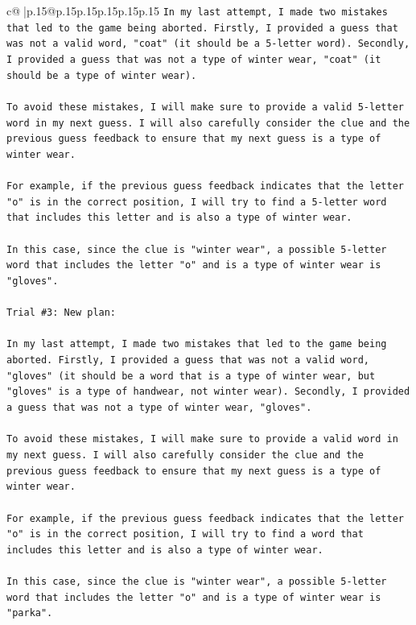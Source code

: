 \documentclass{article}
\begin{document}
{\begin{supertabular}{c@{$\;$}|p{.15\linewidth}@{}p{.15\linewidth}p{.15\linewidth}p{.15\linewidth}p{.15\linewidth}p{.15\linewidth}}
{{{\texttt{In my last attempt, I made two mistakes that led to the game being aborted. Firstly, I provided a guess that was not a valid word, "coat" (it should be a 5{-}letter word). Secondly, I provided a guess that was not a type of winter wear, "coat" (it should be a type of winter wear). } \\
\\ 
\texttt{To avoid these mistakes, I will make sure to provide a valid 5{-}letter word in my next guess. I will also carefully consider the clue and the previous guess feedback to ensure that my next guess is a type of winter wear. } \\
\\ 
\texttt{For example, if the previous guess feedback indicates that the letter "o" is in the correct position, I will try to find a 5{-}letter word that includes this letter and is also a type of winter wear. } \\
\\ 
\texttt{In this case, since the clue is "winter wear", a possible 5{-}letter word that includes the letter "o" and is a type of winter wear is "gloves".} \\
\\ 
\texttt{Trial \#3: New plan: } \\
\\ 
\texttt{In my last attempt, I made two mistakes that led to the game being aborted. Firstly, I provided a guess that was not a valid word, "gloves" (it should be a word that is a type of winter wear, but "gloves" is a type of handwear, not winter wear). Secondly, I provided a guess that was not a type of winter wear, "gloves". } \\
\\ 
\texttt{To avoid these mistakes, I will make sure to provide a valid word in my next guess. I will also carefully consider the clue and the previous guess feedback to ensure that my next guess is a type of winter wear. } \\
\\ 
\texttt{For example, if the previous guess feedback indicates that the letter "o" is in the correct position, I will try to find a word that includes this letter and is also a type of winter wear. } \\
\\ 
\texttt{In this case, since the clue is "winter wear", a possible 5{-}letter word that includes the letter "o" and is a type of winter wear is "parka".} \\
\\ 
}}}
\end{supertabular}}
\end{document}
